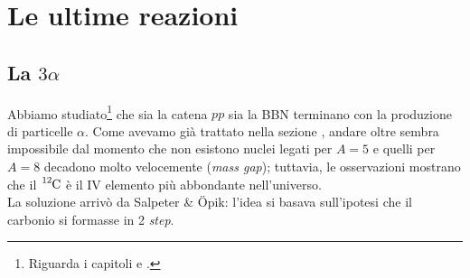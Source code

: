 \chapter{Le ultime reazioni}
\section{La $3\alpha$}
Abbiamo studiato\footnote{Riguarda i capitoli  e .} che sia la catena $pp$ sia la BBN terminano con la produzione di particelle $\alpha$. Come avevamo già trattato nella sezione , andare oltre sembra impossibile dal momento che non esistono nuclei legati per $A=5$ e quelli per $A=8$ decadono molto velocemente (\textit{mass gap}); tuttavia, le osservazioni mostrano che il $\ce{^{12}C}$ è il IV elemento più abbondante nell'universo.\\ 
La soluzione arrivò da Salpeter \& \"{O}pik: l'idea si basava sull'ipotesi che il carbonio si formasse in 2 \textit{step}.
